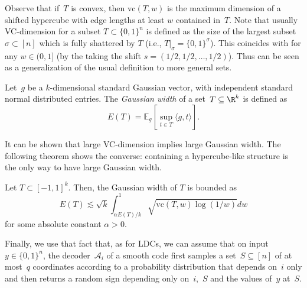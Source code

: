 \documentclass{toc}
\newcommand{\bset}[1]{\{0,1\}^{#1}} %
\newcommand{\E}{\mathbb{E}}
\newcommand{\vc}{{\mathrm{vc}}}
\newcommand{\inpro}[2]{\langle #1,#2 \rangle}
\newcommand{\beqn}{\begin{equation*}}
\newcommand{\eeqn}{\end{equation*}}
\begin{document}
Observe that if~$T$ is convex, then $\vc(T,w)$ is the maximum dimension of a shifted hypercube with edge lengths at least $w$ contained in~$T$. Note that usually VC-dimension for a subset $T\subset \{0,1\}^n$ is defined as the size of the largest subset $\sigma\subset [n]$ which is fully shattered by $T$ (i.e., $T|_\sigma=\{0,1\}^\sigma$). This coincides with  for any $w\in (0,1]$ (by the taking the shift $s=(1/2,1/2,\dots,1/2)$). Thus  can be seen as a generalization of the usual definition to more general sets.

\begin{definition}
Let~$g$ be a $k$-dimensional standard Gaussian vector, with independent standard normal distributed entries.
The \emph{Gaussian width} of a set~$T\subseteq \R^k$ is defined as
\beqn
E(T)=\E_g[\sup_{t\in T} \inpro{g}{t}].
\eeqn
\end{definition}

It can be shown that large VC-dimension implies large Gaussian width.
The following theorem shows the converse: containing a hypercube-like structure is the only way to have large Gaussian width.


\begin{theorem}\label{thm:vcdim}
Let $T\subset [-1,1]^k$. Then, the Gaussian width of $T$ is bounded as
$$E(T) \lesssim \sqrt{k} \int_{\alpha E(T)/k}^1 \sqrt{\vc(T,w) \log (1/w)} dw$$ for some absolute constant $\alpha >0$.
\end{theorem}


Finally, we use that fact that, as for LDCs, we can assume that on input~$y\in\bset{n}$, the decoder~$\mathcal A_i$ of a smooth code first samples a set~$S\subseteq[n]$ of at most~$q$ coordinates according to a probability distribution that depends on~$i$ only and then returns a random sign depending only on~$i$,~$S$ and the values of~$y$ at~$S$.
\end{document}

